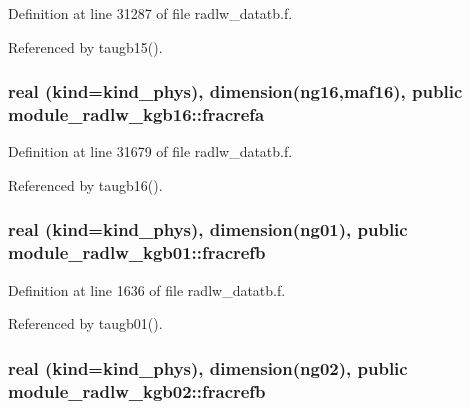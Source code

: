 Definition at line 31287 of file radlw\+\_\+datatb.\+f.



Referenced by taugb15().

\subsubsection[{\texorpdfstring{fracrefa}{fracrefa}}]{\setlength{\rightskip}{0pt plus 5cm}real (kind=kind\+\_\+phys), dimension(ng16,maf16), public module\+\_\+radlw\+\_\+kgb16\+::fracrefa}\hypertarget{group__module__radlw__main_ga355dcc9f6f4955ab3d7ee0a22005c8ba}{}\label{group__module__radlw__main_ga355dcc9f6f4955ab3d7ee0a22005c8ba}


Definition at line 31679 of file radlw\+\_\+datatb.\+f.



Referenced by taugb16().

\subsubsection[{\texorpdfstring{fracrefb}{fracrefb}}]{\setlength{\rightskip}{0pt plus 5cm}real (kind=kind\+\_\+phys), dimension(ng01), public module\+\_\+radlw\+\_\+kgb01\+::fracrefb}\hypertarget{group__module__radlw__main_ga19b6a3893965817e82c77bee1de536cd}{}\label{group__module__radlw__main_ga19b6a3893965817e82c77bee1de536cd}


Definition at line 1636 of file radlw\+\_\+datatb.\+f.



Referenced by taugb01().

\subsubsection[{\texorpdfstring{fracrefb}{fracrefb}}]{\setlength{\rightskip}{0pt plus 5cm}real (kind=kind\+\_\+phys), dimension(ng02), public module\+\_\+radlw\+\_\+kgb02\+::fracrefb}\hypertarget{group__module__radlw__main_gaeedda30c8d2bd7c9e7124c6445c8c20e}{}\label{group__module__radlw__main_gaeedda30c8d2bd7c9e7124c6445c8c20e}


